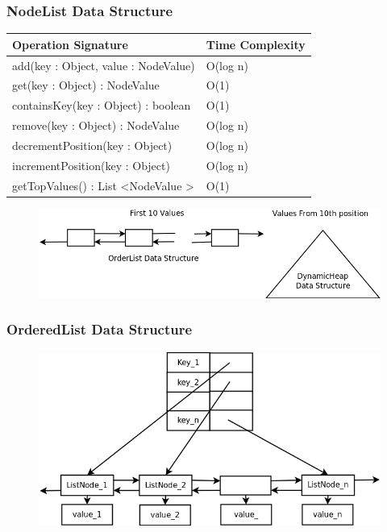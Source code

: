 \documentclass{beamer}
\begin{document}
\begin{frame}
\frametitle{NodeList Data Structure}

\begin{table}
\centering
\begin{tabular}{|l|l|} \hline
Operation Signature & Time Complexity \\ \hline \hline
add(key : Object, value : NodeValue) & O(log n) \\ \hline
get(key : Object) : NodeValue & O(1) \\ \hline
containsKey(key : Object) : boolean & O(1) \\ \hline
remove(key : Object) : NodeValue & O(log n) \\ \hline
decrementPosition(key : Object) & O(log n) \\ \hline
incrementPosition(key : Object) & O(log n) \\ \hline
getTopValues() : List \textless NodeValue \textgreater & O(1) \\ \hline
\end{tabular}
\end{table}

\begin{figure}
        \includegraphics[width=0.8\linewidth]{nodeliststruct.png}
\end{figure}

\end{frame}

\begin{frame}
\frametitle{OrderedList Data Structure}

\begin{figure}
        \includegraphics[width=0.8\linewidth]{orderedlist.png}
\end{figure}

\end{frame}
\end{document}
